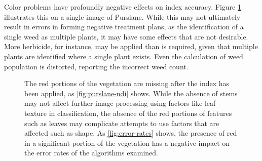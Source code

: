 \documentclass[letterpaper]{report}
\begin{document}
{Color problems have profoundly negative effects on index accuracy. Figure \ref{fig:segmentation-color-problem} illustrates this on a single image of Purslane. While this may not ultimately result in errors in forming negative treatment plans, as the identification of a single weed as multiple plants, it may have some effects that are not desirable. More herbicide, for instance, may be applied than is required, given that multiple plants are identified where a single plant exists. Even the calculation of weed population is distorted, reporting the incorrect weed count.


\begin{figure}[H]
	\centering
	\hfill
	\hfill
	\caption[Missing red portions of vegetation]{The red portions of the vegetation are missing after the index has been applied, as \ref{fig:purslane-ndi} shows. While the absence of stems may not affect further image processing using factors like leaf texture in classification, the absence of the red portions of features such as leaves may complicate attempts to use factors that are affected such as shape. As \ref{fig:error-rates} shows, the presence of red in a significant portion of the vegetation has a negative impact on the error rates of the algorithms examined.}
	\label{fig:segmentation-color-problem}
\end{figure}

}
\end{document}

